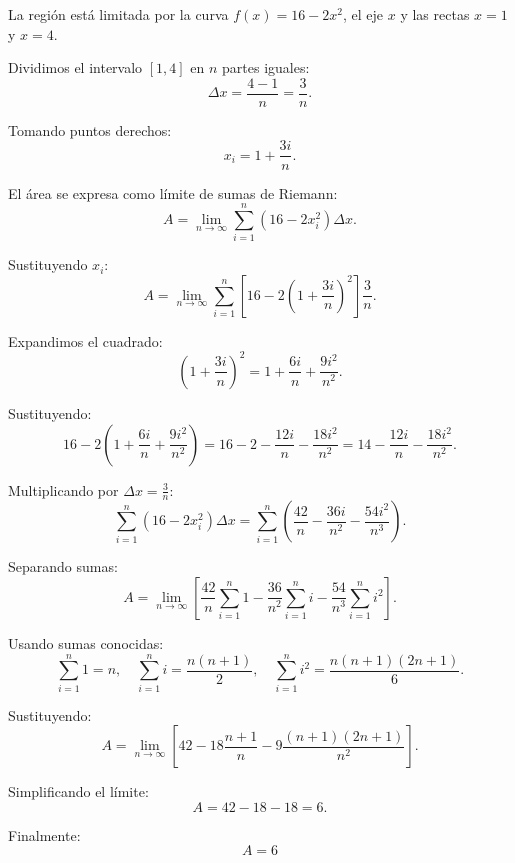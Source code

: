 \nopagebreak

La región está limitada por la curva \(f(x)=16-2x^2\), el eje \(x\) y las rectas
\(x=1\) y \(x=4\).  

Dividimos el intervalo \([1,4]\) en \(n\) partes iguales:
\[
\Delta x = \frac{4-1}{n} = \frac{3}{n}.
\]

Tomando puntos derechos:
\[
x_i = 1 + \frac{3i}{n}.
\]

El área se expresa como límite de sumas de Riemann:
\[
A = \lim_{n\to\infty} \sum_{i=1}^{n} (16 - 2 x_i^2)\Delta x.
\]

Sustituyendo \(x_i\):
\[
A = \lim_{n\to\infty} \sum_{i=1}^{n} \left[16 - 2\left(1 + \frac{3i}{n}\right)^2 \right] \frac{3}{n}.
\]

Expandimos el cuadrado:
\[
\left(1 + \frac{3i}{n}\right)^2 = 1 + \frac{6i}{n} + \frac{9i^2}{n^2}.
\]

Sustituyendo:
\[
16 - 2\left(1 + \frac{6i}{n} + \frac{9i^2}{n^2}\right)
= 16 - 2 - \frac{12 i}{n} - \frac{18 i^2}{n^2} 
= 14 - \frac{12 i}{n} - \frac{18 i^2}{n^2}.
\]

Multiplicando por \(\Delta x = \frac{3}{n}\):
\[
\sum_{i=1}^{n} (16 - 2x_i^2)\Delta x
= \sum_{i=1}^{n} \left( \frac{42}{n} - \frac{36 i}{n^2} - \frac{54 i^2}{n^3} \right).
\]

Separando sumas:
\[
A = \lim_{n\to\infty} \left[
\frac{42}{n}\sum_{i=1}^{n}1
- \frac{36}{n^2}\sum_{i=1}^{n} i
- \frac{54}{n^3}\sum_{i=1}^{n} i^2
\right].
\]

Usando sumas conocidas:
\[
\sum_{i=1}^{n}1 = n, \quad
\sum_{i=1}^{n} i = \frac{n(n+1)}{2}, \quad
\sum_{i=1}^{n} i^2 = \frac{n(n+1)(2n+1)}{6}.
\]

Sustituyendo:
\[
A = \lim_{n\to\infty} \left[
42 - 18\frac{n+1}{n} - 9\frac{(n+1)(2n+1)}{n^2}
\right].
\]

Simplificando el límite:
\[
A = 42 - 18 - 18 = 6.
\]

Finalmente:
\[
\boxed{A = 6}
\]
